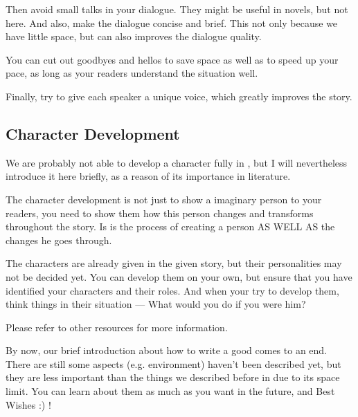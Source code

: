 Then avoid small talks in your dialogue. They might be useful in novels, but not 
here. And also, make the dialogue concise and brief. This not only because we have 
little space, but can also improves the dialogue quality.

You can cut out goodbyes and hellos to save space as well as to speed up your 
pace, as long as your readers understand the situation well.

Finally, try to give each speaker a unique voice, which greatly improves the 
story.

\subsection{Character Development}
We are probably not able to develop a character fully in \DHXX , but I will 
nevertheless introduce it here briefly, as a reason of its importance in 
literature.

The character development is not just to show a imaginary person to your readers, 
you need to show them how this person changes and transforms throughout the story. 
Is is the process of creating a person AS WELL AS the changes he goes through.

The characters are already given in the given story, but their personalities may 
not be decided yet. You can develop them on your own, but ensure that you have 
identified your characters and their roles. And when your try to develop them, 
think things in their situation --- What would you do if you were him?

Please refer to other resources for more information.

By now, our brief introduction about how to write a good \DHXX{} comes to an end.
There are still some aspects (e.g. environment) haven't been described yet, but 
they are less important than the things we described before in \DHXX due to its 
space limit. You can learn about them as much as you want in the future, and 
Best Wishes :) !